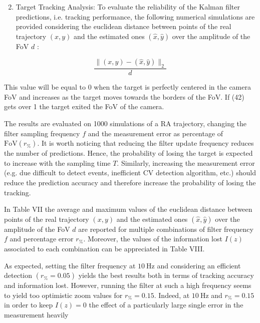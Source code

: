 \documentclass[conference]{IEEEtran}
\begin{document}
\begin{enumerate}
  \setcounter{enumi}{1}
  \item Target Tracking Analysis: To evaluate the reliability of the Kalman filter predictions, i.e. tracking performance, the following numerical simulations are provided considering the euclidean distance between points of the real trajectory $(x, y)$ and the estimated ones $(\hat{x}, \hat{y})$ over the amplitude of the FoV $d$ :
\end{enumerate}


\begin{equation*}
\frac{\|(x, y)-(\hat{x}, \hat{y})\|_{2}}{d} \tag{42}
\end{equation*}


This value will be equal to 0 when the target is perfectly centered in the camera FoV and increases as the target moves towards the borders of the FoV. If (42) gets over 1 the target exited the FoV of the camera.

The results are evaluated on 1000 simulations of a RA trajectory, changing the filter sampling frequency $f$ and the measurement error as percentage of $\mathrm{FoV}\left(r_{\%}\right)$. It is worth noticing that reducing the filter update frequency reduces the number of predictions. Hence, the probability of losing the target is expected to increase with the sampling time $T$. Similarly, increasing the measurement error (e.g. due difficult to detect events, inefficient CV detection algorithm, etc.) should reduce the prediction accuracy and therefore increase the probability of losing the tracking.

In Table VII the average and maximum values of the euclidean distance between points of the real trajectory $(x, y)$ and the estimated ones $(\hat{x}, \hat{y})$ over the amplitude of the FoV $d$ are reported for multiple combinations of filter frequency $f$ and percentage error $r_{\%}$. Moreover, the values of the information lost $I(z)$ associated to each combination can be appreciated in Table VIII.

As expected, setting the filter frequency at $10 \mathrm{~Hz}$ and considering an efficient detection $\left(r_{\%}=0.05\right)$ yields the best results both in terms of tracking accuracy and information lost. However, running the filter at such a high frequency seems to yield too optimistic zoom values for $r_{\%}=0.15$. Indeed, at $10 \mathrm{~Hz}$ and $r_{\%}=0.15$ in order to keep $I(z)=0$ the effect of a particularly large single error in the measurement heavily
\end{document}
